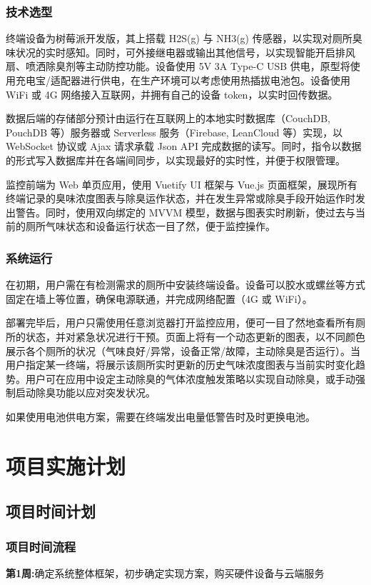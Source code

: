 \documentclass[UTF8]{ctexart}
\begin{document}
\subsubsection{技术选型}
终端设备为树莓派开发版，其上搭载 H2S(g) 与 NH3(g) 传感器，以实现对厕所臭味状况的实时感知。同时，可外接继电器或输出其他信号，以实现智能开启排风扇、喷洒除臭剂等主动防控功能。设备使用 5V 3A Type-C USB 供电，原型将使用充电宝/适配器进行供电，在生产环境可以考虑使用热插拔电池包。设备使用 WiFi 或 4G 网络接入互联网，并拥有自己的设备 token，以实时回传数据。

数据后端的存储部分预计由运行在互联网上的本地实时数据库（Couch\-DB, PouchDB 等）服务器或 Serverless 服务（Firebase, LeanCloud 等）实现，以 WebSocket 协议或 Ajax 请求承载 Json API 完成数据的读写。同时，指令以数据的形式写入数据库并在各端间同步，以实现最好的实时性，并便于权限管理。

监控前端为 Web 单页应用，使用 Vuetify UI 框架与 Vue.js 页面框架，展现所有终端记录的臭味浓度图表与除臭运作状态，并在发生异常或除臭手段开始运作时发出警告。同时，使用双向绑定的 MVVM 模型，数据与图表实时刷新，使过去与当前的厕所气味状态和设备运行状态一目了然，便于监控操作。
\subsubsection{系统运行}
在初期，用户需在有检测需求的厕所中安装终端设备。设备可以胶水或螺丝等方式固定在墙上等位置，确保电源联通，并完成网络配置（4G 或 WiFi）。

部署完毕后，用户只需使用任意浏览器打开监控应用，便可一目了然地查看所有厕所的状态，并对紧急状况进行干预。页面上将有一个动态更新的图表，以不同颜色展示各个厕所的状况（气味良好/异常，设备正常/故障，主动除臭是否运行）。当用户指定某一终端，将展示该厕所实时更新的历史气味浓度图表与当前实时变化趋势。用户可在应用中设定主动除臭的气体浓度触发策略以实现自动除臭，或手动强制启动除臭功能以应对突发状况。

如果使用电池供电方案，需要在终端发出电量低警告时及时更换电池。

\section{项目实施计划}
\subsection{项目时间计划}
\subsubsection{项目时间流程}
\textbf{第1周:}确定系统整体框架，初步确定实现方案，购买硬件设备与云端服务\\
\end{document}
